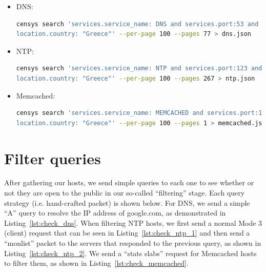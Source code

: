 
\lstset{style=shellstyle}

\begin{itemize}
\item DNS:
\begin{lstlisting}[language=bash, caption=DNS query., label=lst:censys_dns]
censys search 'services.service_name: DNS and services.port:53 and 
location.country: "Greece"' --per-page 100 --pages 77 > dns.json
\end{lstlisting}
\item NTP:
\begin{lstlisting}[language=bash, caption=NTP query., label=lst:censys_ntp]
censys search 'services.service_name: NTP and services.port:123 and 
location.country: "Greece"' --per-page 100 --pages 267 > ntp.json 
\end{lstlisting}
\item Memcached:
\begin{lstlisting}[language=bash, caption=Memcached query., label=lst:censys_memcached]
censys search 'services.service_name: MEMCACHED and services.port:11211 and  
location.country: "Greece"' --per-page 100 --pages 1 > memcached.json
\end{lstlisting}

\end{itemize}




\section{Filter queries}
\label{appendix:filter_queries}

After gathering our hosts, we send simple queries to each one to see whether or not they are open to the public in our so-called ``filtering'' stage. Each query strategy (i.e. hand-crafted packet) is shown below. For DNS, we send a simple ``A'' query to resolve the IP address of google.com, as demonstrated in Listing~\ref{lst:check_dns}. When filtering NTP hosts, we first send a normal Mode 3 (client) request that can be seen in Listing~\ref{lst:check_ntp_1} and then send a ``monlist'' packet to the servers that responded to the previous query, as shown in Listing~\ref{lst:check_ntp_2}. We send a ``stats slabs'' request for Memcached hosts to filter them, as shown in Listing~\ref{lst:check_memcached}.

\lstset{style=pythonstyle}

